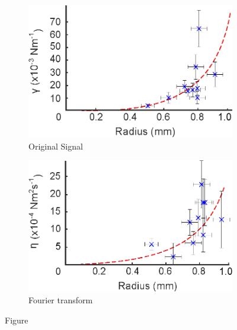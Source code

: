 \documentclass{physics_article_B}
\begin{document}
        \begin{figure}[H]
            \centering   
            \begin{subfigure}[b]{0.48\textwidth}
                \hspace*{0cm}\includegraphics[width=\textwidth]{Figures/r_vs_gamma.eps}
                \caption{Original Signal}
                \label{fig:vsgamma:r}
            \end{subfigure}\hspace{3pt}
            \begin{subfigure}[b]{0.48\textwidth}
                \hspace*{0.1cm}\includegraphics[width=\textwidth]{Figures/r_vs_eta.eps} 
                \caption{Fourier transform}
                \label{fig:vseta:r}
                \end{subfigure}
            \caption{Figure }\label{fig:vsr}
        \end{figure} 
     
\end{document}
